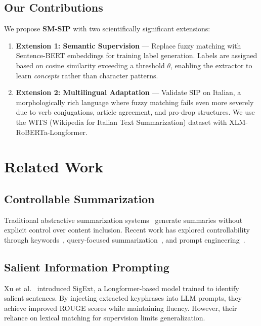 \documentclass[conference]{IEEEtran}
\begin{document}
\subsection{Our Contributions}

We propose \textbf{SM-SIP} with two scientifically significant extensions:

\begin{enumerate}
    \item \textbf{Extension 1: Semantic Supervision} --- Replace fuzzy matching with Sentence-BERT embeddings for training label generation. Labels are assigned based on cosine similarity exceeding a threshold $\theta$, enabling the extractor to learn \textit{concepts} rather than character patterns.
    
    \item \textbf{Extension 2: Multilingual Adaptation} --- Validate SIP on Italian, a morphologically rich language where fuzzy matching fails even more severely due to verb conjugations, article agreement, and pro-drop structures. We use the WITS (Wikipedia for Italian Text Summarization) dataset with XLM-RoBERTa-Longformer.
\end{enumerate}

\section{Related Work}

\subsection{Controllable Summarization}
Traditional abstractive summarization systems~\cite{lewis2020bart, zhang2020pegasus} generate summaries without explicit control over content inclusion. Recent work has explored controllability through keywords~\cite{he2022ctrlsum}, query-focused summarization~\cite{xu2020query}, and prompt engineering~\cite{goyal2022news}.

\subsection{Salient Information Prompting}
Xu et al.~\cite{xu2024sip} introduced SigExt, a Longformer-based model trained to identify salient sentences. By injecting extracted keyphrases into LLM prompts, they achieve improved ROUGE scores while maintaining fluency. However, their reliance on lexical matching for supervision limits generalization.
\end{document}
